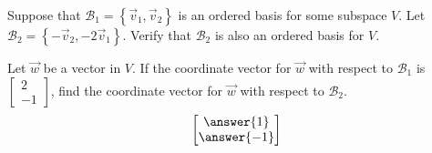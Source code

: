 \documentclass{ximera}
\author{}
\begin{document}
\begin{exercise}
Suppose that $\mathcal{B}_1=\left\{\vec{v}_1, \vec{v}_2\right\}$ is an ordered basis for some subspace $V$.  Let $\mathcal{B}_2=\left\{-\vec{v}_2, -2\vec{v}_1\right\}$.  Verify that $\mathcal{B}_2$ is also an ordered basis for $V$.

Let $\vec{w}$ be a vector in $V$.  If the coordinate vector for $\vec{w}$ with respect to $\mathcal{B}_1$ is $\begin{bmatrix}2\\-1\end{bmatrix}$, find the coordinate vector for $\vec{w}$ with respect to $\mathcal{B}_2$.
$$\begin{bmatrix}\answer{1}\\\answer{-1}\end{bmatrix}$$

\end{exercise}
\end{document}
